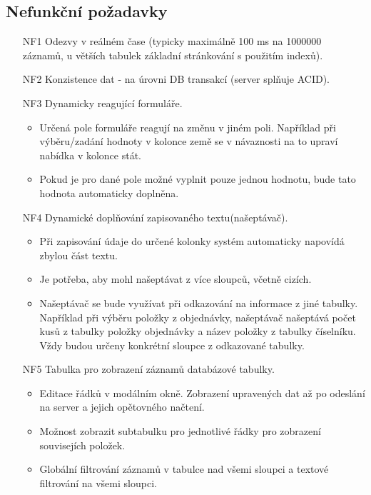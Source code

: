 \documentclass[thesis=B,czech]{FITthesis}[2012/06/26]
\begin{document}
\subsection{Nefunkční požadavky}
\begin{enumerate}
	\item[NF1] Odezvy v reálném čase (typicky maximálně 100 ms na 1000000 záznamů, u větších tabulek základní stránkování s použitím indexů).
	\item[NF2] Konzistence dat - na úrovni DB transakcí (server splňuje ACID).
	\item[NF3] Dynamicky reagující formuláře.
	\begin{itemize}
		\item Určená pole formuláře reagují na změnu v jiném poli. Například při výběru/zadání hodnoty v kolonce země se v návaznosti na to upraví nabídka v kolonce stát. 
		\item Pokud je pro dané pole možné vyplnit pouze jednou hodnotu, bude tato hodnota automaticky doplněna.
	\end{itemize}
	\item[NF4] Dynamické doplňování zapisovaného textu(našeptávač).
	\begin{itemize}
		\item Při zapisování údaje do určené kolonky systém automaticky napovídá zbylou část textu.
		\item Je potřeba, aby mohl našeptávat z více sloupců, včetně cizích. 
		\item Našeptávač se bude využívat při odkazování na informace z jiné tabulky. Například při výběru položky z objednávky, našeptávač našeptává počet kusů z tabulky položky objednávky a název položky z tabulky číselníku. Vždy budou určeny konkrétní sloupce z odkazované tabulky.
	\end{itemize}
	\item[NF5] Tabulka pro zobrazení záznamů databázové tabulky.
	\begin{itemize}
		\item Editace řádků v modálním okně. Zobrazení upravených dat až po odeslání na server a jejich opětovného načtení.
		\item Možnost zobrazit subtabulku pro jednotlivé řádky pro zobrazení souvisejích položek.
		\item Globální filtrování záznamů v tabulce nad všemi sloupci a textové filtrování na všemi sloupci.
	\end{itemize}
\end{enumerate}
\end{document}
